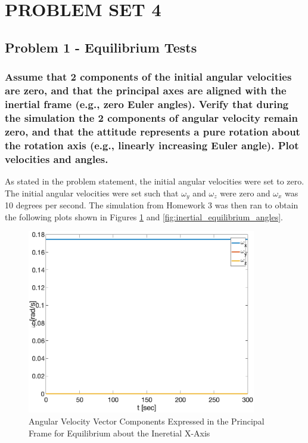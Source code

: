 \section{\Large PROBLEM SET 4}

\subsection{Problem 1 - Equilibrium Tests}

\subsubsection{Assume that 2 components of the initial angular velocities are zero, and that the principal axes are
aligned with the inertial frame (e.g., zero Euler angles). Verify that during the simulation the 2
components of angular velocity remain zero, and that the attitude represents a pure rotation about
the rotation axis (e.g., linearly increasing Euler angle). Plot velocities and angles.}

As stated in the problem statement, the initial angular velocities were set to zero. The initial angular velocities were set such that $\omega_y$ and $\omega_z$ were zero and $\omega_x$ was 10 degrees per second. The simulation from Homework 3 was then ran to obtain the following plots shown in Figures \ref{fig:inertial_equilibrium_velocities} and \ref{fig:inertial_equilibrium_angles}.   

\begin{figure}[H]
    \centering
    \captionsetup{justification = centering}
    \includegraphics[width = 10cm]{Images/PS4/equilibrium_inertial_velocities.png}
    \caption{Angular Velocity Vector Components Expressed in the Principal Frame for Equilibrium about the Ineretial X-Axis}
    \label{fig:inertial_equilibrium_velocities}
\end{figure}

